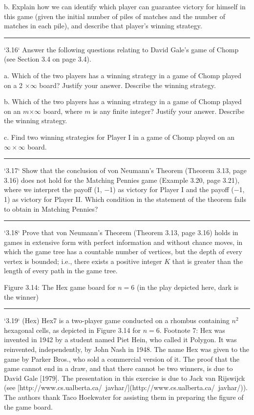 \documentclass[10pt]{report}
\begin{document}
b. Explain how we can identify which player can guarantee victory for himself in this game (given the initial number of piles of matches and the number of matches in each pile), and describe that player's winning strategy.

\vspace{0.5cm}
\hrule
\vspace{0.5cm}
`3.16` Answer the following questions relating to David Gale's game of Chomp (see Section 3.4 on page 3.4).

a. Which of the two players has a winning strategy in a game of Chomp played on a 2 $\times$$\infty$ board? Justify your answer. Describe the winning strategy.

			b. Which of the two players has a winning strategy in a game of Chomp played on an $m$$\times$$\infty$ board, where $m$ is any finite integer? Justify your answer. Describe the winning strategy.

			c. Find two winning strategies for Player I in a game of Chomp played on an $\infty\times$$\infty$ board.

		\vspace{0.5cm}
		\hrule
		\vspace{0.5cm}
		`3.17` Show that the conclusion of von Neumann's Theorem (Theorem 3.13, page 3.16) does not hold for the Matching Pennies game (Example 3.20, page 3.21), where we interpret the payoff (1, $-$1) as victory for Player I and the payoff ($-$1, 1) as victory for Player II. Which condition in the statement of the theorem fails to obtain in Matching Pennies?

		\vspace{0.5cm}
		\hrule
		\vspace{0.5cm}
		`3.18` Prove that von Neumann's Theorem (Theorem 3.13, page 3.16) holds in games in extensive form with perfect information and without chance moves, in which the game tree has a countable number of vertices, but the depth of every vertex is bounded; i.e., there exists a positive integer $K$ that is greater than the length of every path in the game tree.

		Figure 3.14: The Hex game board for $n=6$ (in the play depicted here, dark is the winner)

		\vspace{0.5cm}
		\hrule
		\vspace{0.5cm}
		`3.19` (Hex) Hex7 is a two-player game conducted on a rhombus containing $n^{2}$ hexagonal cells, as depicted in Figure 3.14 for $n=6$.
		Footnote 7: Hex was invented in 1942 by a student named Piet Hein, who called it Polygon. It was reinvented, independently, by John Nash in 1948. The name Hex was given to the game by Parker Bros., who sold a commercial version of it. The proof that the game cannot end in a draw, and that there cannot be two winners, is due to David Gale [1979]. The presentation in this exercise is due to Jack van Rijswijck (see [http://www.cs.ualberta.ca/~javhar/](http://www.cs.ualberta.ca/~javhar/)). The authors thank Taco Hoekwater for assisting them in preparing the figure of the game board.
\end{document}
